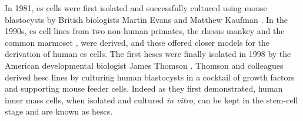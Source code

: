 In 1981, \gls{es} cells were first isolated and successfully cultured using mouse blastocysts by British biologists Martin Evans and Matthew Kaufman \cite{evans1981establishment, martin1981isolation}.
In the 1990s, \gls{es} cell lines from two non-human primates, the rhesus monkey \cite{thomson1995isolation} and the common marmoset \cite{thomson1996pluripotent}, were derived, and these offered closer models for the derivation of human \gls{es} cells. 
The first \glspl{hesc} were finally isolated in 1998 by the American developmental biologist James Thomson \cite{thomson1998embryonic}.
Thomson and colleagues derived \gls{hesc} lines by culturing human blastocysts in a cocktail of growth factors and supporting mouse feeder cells.
Indeed as they first demonstrated, human inner mass cells, when isolated and cultured \textit{in vitro}, can be kept in the stem-cell stage and are known as  \glspl{hesc}. \\

